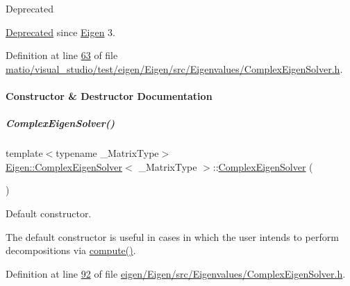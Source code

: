 \begin{DoxyRefDesc}{Deprecated}
\item[\hyperlink{deprecated__deprecated000060}{Deprecated}]since \hyperlink{namespace_eigen}{Eigen} 3. \end{DoxyRefDesc}


Definition at line \hyperlink{matio_2visual__studio_2test_2eigen_2_eigen_2src_2_eigenvalues_2_complex_eigen_solver_8h_source_l00063}{63} of file \hyperlink{matio_2visual__studio_2test_2eigen_2_eigen_2src_2_eigenvalues_2_complex_eigen_solver_8h_source}{matio/visual\+\_\+studio/test/eigen/\+Eigen/src/\+Eigenvalues/\+Complex\+Eigen\+Solver.\+h}.



\paragraph{Constructor \& Destructor Documentation}
\mbox{\label{group___eigenvalues___module_a3322a21574c61eefd450c003515ad802}} 
\subparagraph{\texorpdfstring{Complex\+Eigen\+Solver()}{ComplexEigenSolver()}\hspace{0.1cm}{\footnotesize\ttfamily [1/6]}}
{\footnotesize\ttfamily template$<$typename \+\_\+\+Matrix\+Type$>$ \\
\hyperlink{group___eigenvalues___module_class_eigen_1_1_complex_eigen_solver}{Eigen\+::\+Complex\+Eigen\+Solver}$<$ \+\_\+\+Matrix\+Type $>$\+::\hyperlink{group___eigenvalues___module_class_eigen_1_1_complex_eigen_solver}{Complex\+Eigen\+Solver} (\begin{DoxyParamCaption}{ }\end{DoxyParamCaption})\hspace{0.3cm}{\ttfamily [inline]}}



Default constructor. 

The default constructor is useful in cases in which the user intends to perform decompositions via \hyperlink{group___eigenvalues___module_aeb7e38c6db5369f5c974f3786e94c1f0}{compute()}. 

Definition at line \hyperlink{eigen_2_eigen_2src_2_eigenvalues_2_complex_eigen_solver_8h_source_l00092}{92} of file \hyperlink{eigen_2_eigen_2src_2_eigenvalues_2_complex_eigen_solver_8h_source}{eigen/\+Eigen/src/\+Eigenvalues/\+Complex\+Eigen\+Solver.\+h}.


